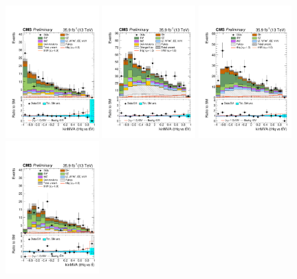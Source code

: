 \begin{figure}[!htb]
  \begin{center}
    \includegraphics[width=0.32\textwidth]{Figures/polished/thqMVA_ttv_3l_40_3l.pdf} 
    \includegraphics[width=0.32\textwidth]{Figures/polished/thqMVA_ttv_2lss_40_em.pdf}
    \includegraphics[width=0.32\textwidth]{Figures/polished/thqMVA_ttv_2lss_40_mm.pdf} \\
    \includegraphics[width=0.32\textwidth]{Figures/polished/thqMVA_tt_3l_40_3l.pdf}

\end{center}
\end{figure}
